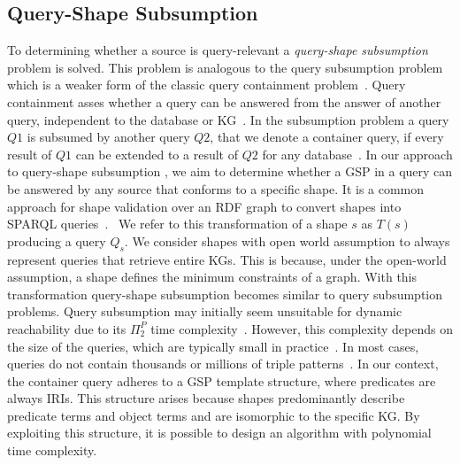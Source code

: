 \subsection{Query-Shape Subsumption}\label{sec:containment}
To determining whether a source is query-relevant a \emph{query-shape subsumption} problem is solved.  
This problem is analogous to the query subsumption problem which is a weaker form of the classic query containment problem~\cite{Spasi2023}.
Query containment asses whether a query can be answered from the answer of another query,  independent to the database or KG~\cite{afariQCE}.
In the subsumption problem a query $Q1$ is subsumed by another query $Q2$, that we denote a container query, if every result of $Q1$ can be extended to a result of $Q2$ for any database~\cite{Spasi2023, Pichler2014}.
In our approach to query-shape subsumption , we aim to determine whether a GSP in a query can be answered by any source that conforms to a specific shape.
It is a common approach for shape validation over an RDF graph to convert shapes into SPARQL queries~\cite{labragayo2017validatingdescribinglinkeddata, Corman2019,Prestamo2023, spapeExpressionConvert}.~
We refer to this transformation of a shape $s$ as $T(s)$ producing a query $Q_s$.
We consider shapes with open world assumption to always represent queries that retrieve entire KGs.
This is because, under the open-world assumption, a shape defines the minimum constraints of a graph.
With this transformation query-shape subsumption  becomes similar to query subsumption problems.
Query subsumption may initially seem unsuitable for dynamic reachability due to its $\Pi^P_2$ time complexity~\cite{Pichler2014, Letelier2013}.  
However, this complexity depends on the size of the queries, which are typically small in practice~\cite{Doan2012}.  
In most cases, queries do not contain thousands or millions of triple patterns~\cite{Bonifati2019}.  
In our context, the container query adheres to a GSP template structure, where predicates are always IRIs.
This structure arises because shapes predominantly describe predicate terms and object terms and are isomorphic to the specific KG.
By exploiting this structure, it is possible to design an algorithm with polynomial time complexity.

